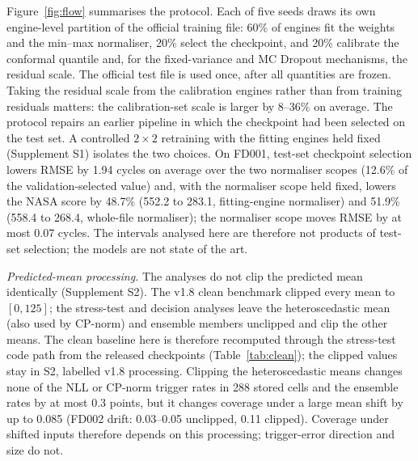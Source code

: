 \documentclass[11pt,a4paper]{article}
\newcommand{\NFairRatio}{8--36}
\newcommand{\NNormAbsMaxRMSE}{0.07}
\newcommand{\JClipRateMaxEns}{0.3}
\newcommand{\JClipRateN}{288}
\newcommand{\JClipPICPmaxDrift}{0.085}
\newcommand{\JClipDriftTwoU}{0.03--0.05}
\newcommand{\JClipDriftTwoA}{0.11}
\begin{document}
Figure~\ref{fig:flow} summarises the protocol. Each of five seeds draws its own engine-level partition of the official training file: 60\% of engines fit the weights and the min--max normaliser, 20\% select the checkpoint, and 20\% calibrate the conformal quantile and, for the fixed-variance and MC Dropout mechanisms, the residual scale. The official test file is used once, after all quantities are frozen. Taking the residual scale from the calibration engines rather than from training residuals matters: the calibration-set scale is larger by \NFairRatio\% on average. The protocol repairs an earlier pipeline in which the checkpoint had been selected on the test set. A controlled $2\times2$ retraining with the fitting engines held fixed (Supplement S1) isolates the two choices. On FD001, test-set checkpoint selection lowers RMSE by 1.94 cycles on average over the two normaliser scopes (12.6\% of the validation-selected value) and, with the normaliser scope held fixed, lowers the NASA score by 48.7\% (552.2 to 283.1, fitting-engine normaliser) and 51.9\% (558.4 to 268.4, whole-file normaliser); the normaliser scope moves RMSE by at most \NNormAbsMaxRMSE{} cycles. The intervals analysed here are therefore not products of test-set selection; the models are not state of the art.

\emph{Predicted-mean processing.} The analyses do not clip the predicted mean identically (Supplement S2). The v1.8 clean benchmark clipped every mean to $[0,125]$; the stress-test and decision analyses leave the heteroscedastic mean (also used by CP-norm) and ensemble members unclipped and clip the other means. The clean baseline here is therefore recomputed through the stress-test code path from the released checkpoints (Table~\ref{tab:clean}); the clipped values stay in S2, labelled v1.8 processing. Clipping the heteroscedastic means changes none of the NLL or CP-norm trigger rates in \JClipRateN{} stored cells and the ensemble rates by at most \JClipRateMaxEns{} points, but it changes coverage under a large mean shift by up to \JClipPICPmaxDrift{} (FD002 drift: \JClipDriftTwoU{} unclipped, \JClipDriftTwoA{} clipped). Coverage under shifted inputs therefore depends on this processing; trigger-error direction and size do not.
\end{document}
